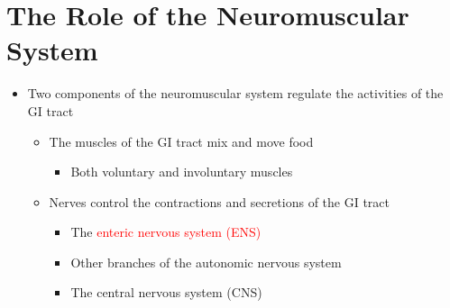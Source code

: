 \documentclass[title={Chapter 3}]{fdsn201notes}
\begin{document}
\section{The Role of the Neuromuscular System}\label{sec:the-role-of-the-neuromuscular-system}
\begin{itemize}
	\item Two components of the neuromuscular system regulate the activities of the GI tract
	\begin{itemize}
		\item The muscles of the GI tract mix and move food
		\begin{itemize}
			\item Both voluntary and involuntary muscles
		\end{itemize}
		\item Nerves control the contractions and secretions of the GI tract
		\begin{itemize}
			\item The \textcolor{red}{enteric nervous system (ENS)}
			\item Other branches of the autonomic nervous system
			\item The central nervous system (CNS)
		\end{itemize}
	\end{itemize}
\end{itemize}
\end{document}
